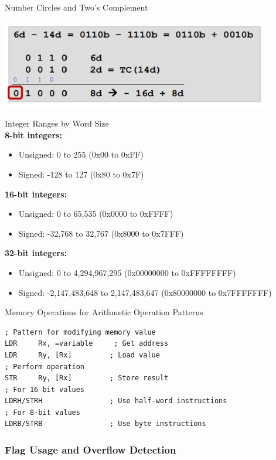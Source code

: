 \begin{concept}{Number Circles and Two's Complement}
\begin{minipage}[t]{0.55\linewidth}
\includegraphics[width=\linewidth]{images/subborrow.png}
\end{minipage}
\end{concept}

\begin{example2}{Integer Ranges by Word Size}\\
\textbf{8-bit integers:}
\begin{itemize}
  \item Unsigned: 0 to 255 (0x00 to 0xFF)
  \item Signed: -128 to 127 (0x80 to 0x7F)
\end{itemize}

\textbf{16-bit integers:}
\begin{itemize}
  \item Unsigned: 0 to 65,535 (0x0000 to 0xFFFF)
  \item Signed: -32,768 to 32,767 (0x8000 to 0x7FFF)
\end{itemize}

\textbf{32-bit integers:}
\begin{itemize}
  \item Unsigned: 0 to 4,294,967,295 (0x00000000 to 0xFFFFFFFF)
  \item Signed: -2,147,483,648 to 2,147,483,647 (0x80000000 to 0x7FFFFFFF)
\end{itemize}
\end{example2}

\begin{KR}{Memory Operations for Arithmetic Operation Patterns}
\begin{lstlisting}[language=armasm, style=basesmol]
; Pattern for modifying memory value
LDR     Rx, =variable     ; Get address
LDR     Ry, [Rx]         ; Load value
; Perform operation
STR     Ry, [Rx]         ; Store result
; For 16-bit values
LDRH/STRH                ; Use half-word instructions
; For 8-bit values
LDRB/STRB                ; Use byte instructions
\end{lstlisting}
\end{KR}

\subsubsection{Flag Usage and Overflow Detection}


